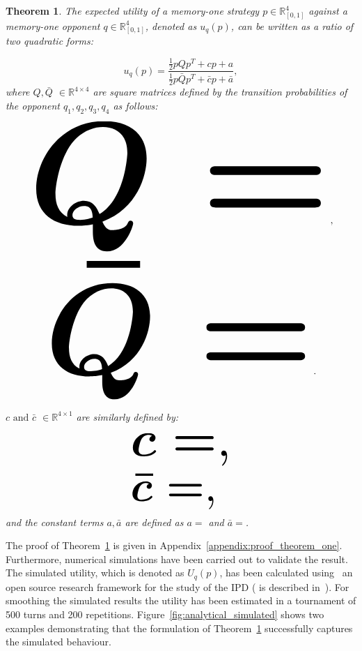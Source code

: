 \documentclass[10pt]{article}
\newcommand{\R}{\mathbb{R}}
\newtheorem{theorem}{Theorem}
\begin{document}
\begin{theorem}\label{theorem:quadratic_form_u}
    The expected utility of a memory-one strategy \(p\in\mathbb{R}_{[0,1]}^4\)
    against a memory-one opponent \(q\in\mathbb{R}_{[0,1]}^4\), denoted
    as \(u_q(p)\), can be written as a ratio of two quadratic forms:

    \begin{equation}\label{eq:optimisation_quadratic}
    u_q(p) = \frac{\frac{1}{2}pQp^T + cp + a}
                {\frac{1}{2}p\bar{Q}p^T + \bar{c}p + \bar{a}},
    \end{equation}
    where \(Q, \bar{Q}\) \(\in \R^{4\times4}\) are square matrices defined by the
    transition probabilities of the opponent \(q_1, q_2, q_3, q_4\) as follows:

    \begin{center}
    \begin{equation}
    \resizebox{0.9\linewidth}{!}{\arraycolsep=2.5pt%
    \boldmath\(
    Q = \)},
    \end{equation}
    \begin{equation}\label{eq:q_bar_matrix}
    \resizebox{0.8\linewidth}{!}{\arraycolsep=2.5pt%
    \boldmath\(
    \bar{Q} =  \)}.
    \end{equation}
    \end{center}

    \(c \text{ and } \bar{c}\) \(\in \R^{4 \times 1}\) are similarly defined by:

    \begin{equation}\label{eq:q_matrix_numerator}
    \resizebox{0.3\linewidth}{!}{\arraycolsep=2.5pt%
    \boldmath\(c = \),}
    \end{equation}
    \begin{equation}\label{eq:q_matrix_denominator}
    \resizebox{0.3\linewidth}{!}{\arraycolsep=2.5pt%
    \boldmath\(\bar{c} = \),
    }
    \end{equation}
    and the constant terms \(a, \bar{a}\) are defined as \(a = \) and
    \(\bar{a} = \).
\end{theorem}

The proof of Theorem~\ref{theorem:quadratic_form_u} is given in
Appendix~\ref{appendix:proof_theorem_one}. Furthermore, numerical simulations
have been carried out to validate the result. The simulated utility, which is
denoted as \(U_q(p)\), has been calculated using~\cite{axelrodproject} an open
source research framework for the study of the IPD (\cite{axelrodproject} is
described in~\cite{Knight2016}). For smoothing the simulated results the utility
has been estimated in a tournament of 500 turns and 200 repetitions.
Figure~\ref{fig:analytical_simulated} shows two examples demonstrating that the
formulation of Theorem~\ref{theorem:quadratic_form_u} successfully captures the
simulated behaviour.
\end{document}
